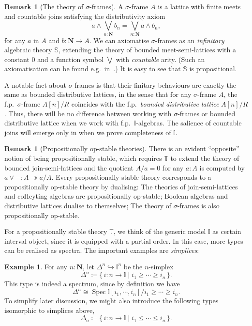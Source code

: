 \documentclass[12pt]{amsart}
\theoremstyle{definition}
\newtheorem{example}[theorem]{Example}
\newtheorem{remark}[theorem]{Remark}
\newcommand{\mb}[1]{\mathbf{#1}}
\newcommand{\mbb}[1]{\mathbb{#1}}
\newcommand{\T}{\mbb T}
\newcommand{\I}{\mbb I}
\newcommand{\scomp}[2]{\{\,#1\mid#2\,\}}
\newcommand{\surj}{\twoheadrightarrow}
\newcommand{\hook}{\hookrightarrow}
\newcommand{\N}{\mb N}
\newcommand{\spec}{\operatorname{Spec}}
\begin{document}
\begin{remark}[The theory of $\sigma$-frames]\label{rem:sigmaframe}
  A $\sigma$-frame $A$ is a lattice with finite meets and countable joins satisfying the distributivity axiom 
  \[ a \wedge \bigvee_{n:\N} b_n = \bigvee_{n:\N} a \wedge b_n, \]
  for any $a$ in $A$ and $b \colon \N \to A$. We can axiomatise $\sigma$-frames as an \emph{infinitary} algebraic theory $\mbb S$, extending the theory of bounded meet-semi-lattices with a constant $0$ and a function symbol $\bigvee$ with \emph{countable} arity. (Such an axiomatisation can be found e.g.\ in~\citet[Exa.~3.26]{adamek1994locally}.) It is easy to see that $\mbb S$ is propositional. 

  A notable fact about $\sigma$-frames is that their finitary behaviours are exactly the same as bounded distributive lattices, in the sense that for any $\sigma$-frame $A$, the f.p.\ $\sigma$-frame $A[n]/R$ coincides with the f.p.\ \emph{bounded distributive lattice} $A[n]/R$. Thus, there will be no difference between working with $\sigma$-frames or bounded distributive lattice when we work with f.p.\ $\I$-algebras. The salience of countable joins will emerge only in  when we prove completeness of $\I$.
\end{remark}

\begin{remark}[Propositionally op-stable theories]\label{rem:opprop}
  There is an evident ``opposite'' notion of being propositionally stable, which requires $\T$ to extend the theory of bounded join-semi-lattices and the quotient $A/a = 0$ for any $a:A$ is computed by $a \vee - : A \surj a/A$. Every propositionally stable theory corresponds to a propositionally op-stable theory by dualising: The theories of join-semi-lattices and coHeyting algebras are propositionally op-stable; Boolean algebras and distributive lattices dualise to themselves; The theory of $\sigma$-frames is also propositionally op-stable.
\end{remark}

For a propositionally stable theory $\T$, we think of the generic model $\I$ as certain interval object, since it is equipped with a partial order. In this case, more types can be realised as spectra. The important examples are \emph{simplices}:

\begin{example}\label{exm:simplicesaffine}
  For any $n : \N$, let $\Delta^n \hook \I^n$ be the $n$-simplex
  \[ \Delta^n \coloneq \scomp{i \colon n \to \I}{i_1 \ge \cdots \ge i_n}. \]
  This type is indeed a spectrum, since by definition we have
  \[ \Delta^n \cong \spec\I[i_1,\cdots,i_n]/i_1\ge\cdots\ge i_n. \]
  To simplify later discussion, we might also introduce the following types isomorphic to simplices above,
  \[ \Delta_n \coloneq \scomp{i \colon n \to \I}{i_1 \le \cdots \le i_n}. \]
\end{example}
\end{document}
